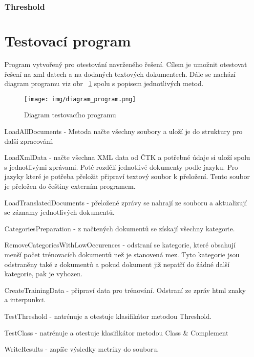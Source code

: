 \documentclass{bakalarka}[12pt]
\begin{document}
\subsubsection{Threshold}

\section{Testovací program} 
Program vytvořený pro otestování navrženého řešení. Cílem je umožnit otestovat řešení na xml datech a na dodaných textových dokumentech. Dále se nachází diagram programu viz obr ~\ref{overflow} spolu s popisem jednotlivých metod.
\begin{figure}[ht!]
\centering
\texttt{[image: img/diagram\_program.png]}
\caption{Diagram testovacího programu \label{overflow}}
\end{figure}

\noindent LoadAllDocuments - Metoda načte všechny soubory a uloží je do struktury pro další zpracování. 

\noindent LoadXmlData - načte všechna XML data od ČTK a potřebné údaje si uloží spolu s jednotlivými zprávami. Poté rozdělí jednotlivé dokumenty podle jazyku. Pro jazyky které je potřeba přeložit připraví textový soubor k přeložení. Tento soubor je přeložen do češtiny externím programem.

\noindent LoadTranslatedDocuments -  přeložené zprávy se nahrají ze souboru a aktualizují se záznamy jednotlivých dokumentů.

\noindent CategoriesPreparation - z načtených dokumentů se získají všechny kategorie.

\noindent RemoveCategoriesWithLowOccurences - odstraní se kategorie, které obsahují menší počet trénovacích dokumentů než je stanovená mez. Tyto kategorie jsou odstraněny také z dokumentů a pokud dokument již nepatří do žádné další kategorie, pak je vyhozen.

\noindent CreateTrainingData - připraví data pro trénování. Odstraní ze zpráv html znaky a interpunkci.

\noindent TestThreshold - natrénuje a otestuje klasifikátor metodou Threshold.

\noindent TestClass - natrénuje a otestuje klasifikátor metodou Class \& Complement

\noindent WriteResults - zapíše výsledky metriky do souboru.

\appendix


\end{document}

